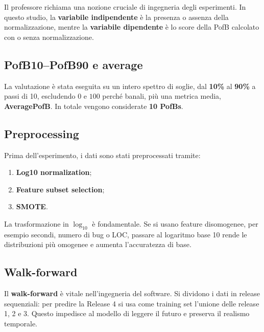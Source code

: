 \begin{notaprof}
Il professore richiama una nozione cruciale di ingegneria degli esperimenti. In questo studio, la \textbf{variabile indipendente} è la presenza o assenza della normalizzazione, mentre la \textbf{variabile dipendente} è lo score della PofB calcolato con o senza normalizzazione.
\end{notaprof}

\subsection{PofB10--PofB90 e average}

La valutazione è stata eseguita su un intero spettro di soglie, dal \textbf{10\%} al \textbf{90\%} a passi di 10, escludendo \(0\) e \(100\) perché banali, più una metrica media, \textbf{AveragePofB}. In totale vengono considerate \textbf{10 PofBs}.

\subsection{Preprocessing}

Prima dell'esperimento, i dati sono stati preprocessati tramite:
\begin{enumerate}
    \item \textbf{Log10 normalization};
    \item \textbf{Feature subset selection};
    \item \textbf{SMOTE}.
\end{enumerate}

\begin{notaprof}
La trasformazione in \(\log_{10}\) è fondamentale. Se si usano feature disomogenee, per esempio secondi, numero di bug o LOC, passare al logaritmo base 10 rende le distribuzioni più omogenee e aumenta l'accuratezza di base.
\end{notaprof}

\subsection{Walk-forward}

\begin{notaprof}
Il \textbf{walk-forward} è vitale nell'ingegneria del software. Si dividono i dati in release sequenziali: per predire la Release 4 si usa come training set l'unione delle release 1, 2 e 3. Questo impedisce al modello di leggere il futuro e preserva il realismo temporale.
\end{notaprof}

